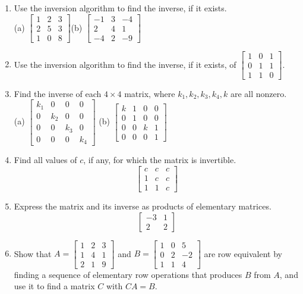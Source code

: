 \documentclass{article}
\theoremstyle{mystyle}
\begin{document}
\begin{enumerate}
    \item[11.] Use the inversion algorithm to find the inverse, if it exists.\\
    (a) $\begin{bmatrix}1&2&3\\2&5&3\\1&0&8\end{bmatrix}$\qquad (b) $\begin{bmatrix}-1&3&-4\\2&4&1\\-4&2&-9\end{bmatrix}$

    \item[13.] Use the inversion algorithm to find the inverse, if it exists, of $\begin{bmatrix}1&0&1\\0&1&1\\1&1&0\end{bmatrix}$.

    \item[19.] Find the inverse of each $4\times4$ matrix, where $k_1,k_2,k_3,k_4,k$ are all nonzero.\\
    (a) $\begin{bmatrix}k_1&0&0&0\\0&k_2&0&0\\0&0&k_3&0\\0&0&0&k_4\end{bmatrix}$\qquad
    (b) $\begin{bmatrix}k&1&0&0\\0&1&0&0\\0&0&k&1\\0&0&0&1\end{bmatrix}$

    \item[21.] Find all values of $c$, if any, for which the matrix is invertible.
    \[
    \begin{bmatrix}c&c&c\\1&c&c\\1&1&c\end{bmatrix}
    \]

    \item[23.] Express the matrix and its inverse as products of elementary matrices.
    \[
    \begin{bmatrix}-3&1\\2&2\end{bmatrix}
    \]

    \item[27.] Show that $A=\begin{bmatrix}1&2&3\\1&4&1\\2&1&9\end{bmatrix}$ and $B=\begin{bmatrix}1&0&5\\0&2&-2\\1&1&4\end{bmatrix}$ are row equivalent by finding a sequence of elementary row operations that produces $B$ from $A$, and use it to find a matrix $C$ with $CA=B$.


\end{enumerate}
\end{document}
